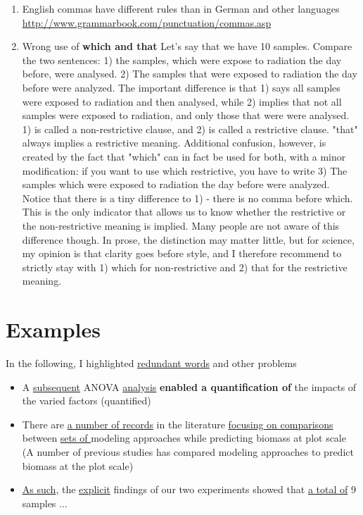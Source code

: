 \documentclass{tufte-book}
\begin{document}
\begin{enumerate}[(A)]
\begin{enumerate}
	\item English commas have different rules than in German and other languages \url{http://www.grammarbook.com/punctuation/commas.asp}
	\item Wrong use of \textbf{which and that} Let's say that we have 10 samples. Compare the two sentences: 1) the samples, which were expose to radiation the day before, were analysed. 2) The samples that were exposed to radiation the day before were analyzed. The important difference is that 1) says all samples were exposed to radiation and then analysed, while 2) implies that not all samples were exposed to radiation, and only those that were were analysed. 1) is called a non-restrictive clause, and 2) is called a restrictive clause. "that" always implies a restrictive meaning. Additional confusion, however, is created by the fact that "which" can in fact be used for both, with a minor modification: if you want to use which restrictive, you have to write 3) The samples which were exposed to radiation the day before were analyzed. Notice that there is a tiny difference to 1) - there is no comma before which. This is the only indicator that allows us to know whether the restrictive or the non-restrictive meaning is implied. Many people are not aware of this difference though. In prose, the distinction may matter little, but for science, my opinion is that clarity goes before style, and I therefore recommend to strictly stay with 1) which for non-restrictive and 2) that for the restrictive meaning.
\end{enumerate}



\end{enumerate}


\section{Examples}

In the following, I highlighted \uline{redundant words} and other problems

\begin{itemize}

\item A \uline{subsequent} ANOVA \uline{analysis} \textbf{enabled a quantification of} the impacts of the varied factors (quantified)

\item There are \uline{a number of records} in the literature \uline{focusing on comparisons} between \uline{sets of }modeling approaches while predicting biomass at plot scale (A number of previous studies has compared modeling approaches to predict biomass at the plot scale)

\item \uline{As such}, the \uline{explicit} findings of our two experiments showed that \uline{a total of} 9 samples ... 

\end{itemize}
\end{document}
